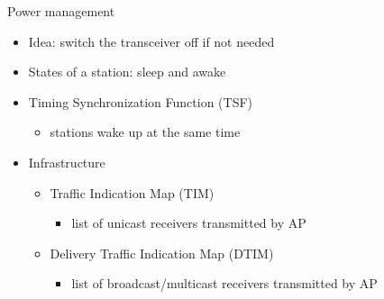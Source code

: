 \documentclass[pdf]{beamer}
\begin{document}
\begin{frame}{Power management}
  \begin{itemize}
  \item Idea: switch the transceiver off if not needed
  \item States of a station: sleep and awake
  \item Timing Synchronization Function (TSF)
    \begin{itemize}
    \item stations wake up at the same time 
    \end{itemize}
  \item Infrastructure
    \begin{itemize}
    \item Traffic Indication Map (TIM)    
      \begin{itemize}
      \item list of unicast receivers transmitted by AP
      \end{itemize}      
    \item Delivery Traffic Indication Map (DTIM)   
      \begin{itemize}
      \item list of broadcast/multicast receivers transmitted by AP
      \end{itemize}
    \end{itemize}    
  \end{itemize}
\end{frame}
\end{document}
